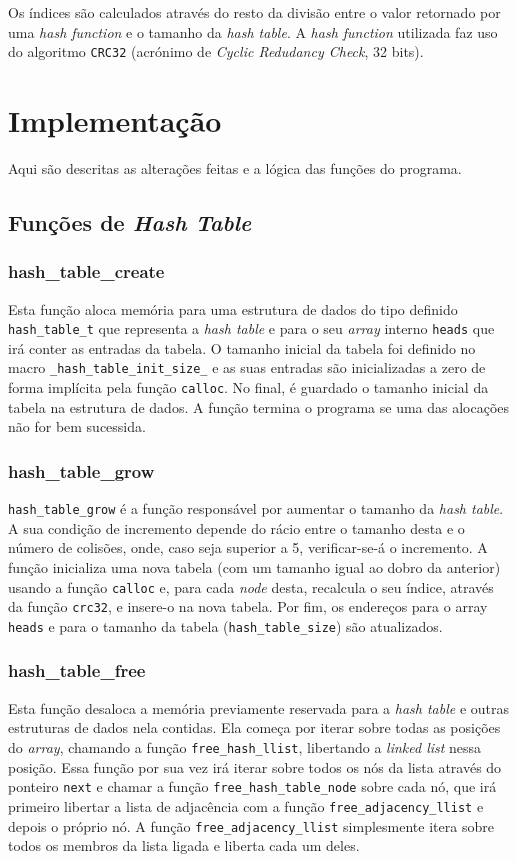 \documentclass[portuguese,11pt,a4paper,titlepage]{article}
\newcommand{\foreign}[1]{\textit{#1}}
\begin{document}
Os índices são calculados através do resto da divisão entre o valor retornado por uma \textit{hash function} e o tamanho da \textit{hash table}. A \textit{hash function} utilizada faz uso do algoritmo \verb|CRC32| (acrónimo de \textit{Cyclic Redudancy Check}, 32 bits).

\section{Implementação}
Aqui são descritas as alterações feitas e a lógica das funções do programa.

\subsection{Funções de \textit{Hash Table}}

\subsubsection{hash\_table\_create}
Esta função aloca memória para uma estrutura de dados do tipo definido \verb|hash_table_t| que
representa a \foreign{hash table} e para o seu \foreign{array} interno \verb|heads| que irá
conter as entradas da tabela. O tamanho inicial da tabela foi definido no macro
\verb|_hash_table_init_size_| e as suas entradas são inicializadas a zero de forma implícita pela
função \verb|calloc|. No final, é guardado o tamanho inicial da tabela na estrutura de dados. A função termina o programa se uma das alocações não for bem sucessida.

\subsubsection{hash\_table\_grow}
\verb|hash_table_grow| é a função responsável por aumentar o tamanho da \foreign{hash table}. A sua condição de incremento depende do rácio entre o tamanho desta e o número de colisões, onde, caso seja superior a 5, verificar-se-á o incremento. A função inicializa uma nova tabela (com um tamanho igual ao dobro da anterior) usando a função \verb|calloc| e, para cada \textit{node} desta, recalcula o seu índice, através da função \verb|crc32|, e insere-o na nova tabela. Por fim, os endereços para o array \verb|heads| e para o tamanho da tabela (\verb|hash_table_size|) são atualizados.

\subsubsection{hash\_table\_free}
Esta função desaloca a memória previamente reservada para a \foreign{hash table} e outras
estruturas de dados nela contidas. Ela começa por iterar sobre todas as posições do \foreign{array}, chamando a função \verb|free_hash_llist|, libertando a \foreign{linked list} nessa posição. Essa função por sua vez irá iterar sobre todos os nós da lista através
do ponteiro \verb|next| e chamar a função \verb|free_hash_table_node| sobre cada nó, que irá primeiro libertar a lista de adjacência com a função \verb|free_adjacency_llist| e depois o próprio nó. A função \verb|free_adjacency_llist| simplesmente itera sobre todos
os membros da lista ligada e liberta cada um deles.
\end{document}
